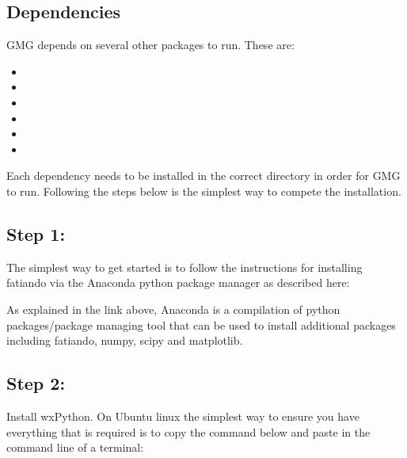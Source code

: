 \documentclass[a4paper,10pt,english]{sphinxmanual}
\begin{document}
\subsection{Dependencies}
\label{\detokenize{installation:dependencies}}
GMG depends on several other packages to run. These are:
\begin{itemize}
\item {} 

\item {} 

\item {} 

\item {} 

\item {} 

\item {} 

\end{itemize}

Each dependency needs to be installed in the correct directory in order for GMG to run. Following the steps below is
the simplest way to compete the installation.


\subsection{Step 1:}
\label{\detokenize{installation:step-1}}
The simplest way to get started is to follow the instructions for installing fatiando via the Anaconda
python package manager as described here:


As explained in the link above, Anaconda is a compilation of python packages/package
managing tool that can be used to install additional packages including fatiando, numpy, scipy and matplotlib.


\subsection{Step 2:}
\label{\detokenize{installation:step-2}}
Install wxPython. On Ubuntu linux the simplest way to ensure you have everything that is required
is to copy the command below and paste in the command line of a terminal:
\end{document}
